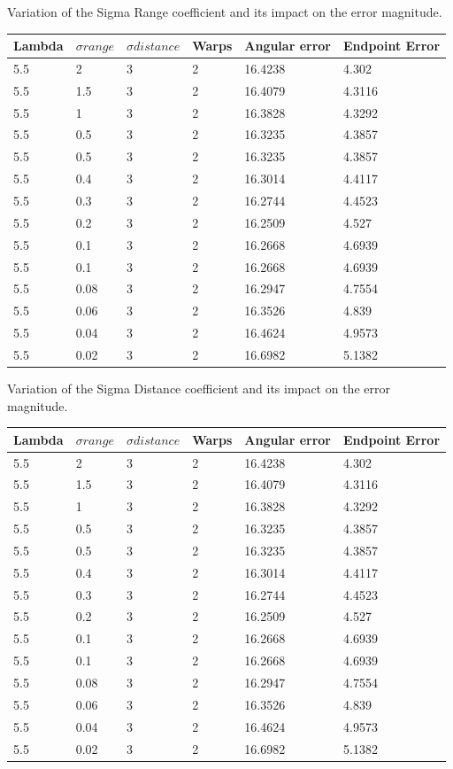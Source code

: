 \documentclass[12pt,a4paper,twoside]{report}
\begin{document}
{\newpage
 Variation of the Sigma Range coefficient and its impact on the error magnitude.
 \begin{center}
 	\begin{tabular}{  l  l  l  l  l l}
 		\hline
 		Lambda &  $\sigma range$ & $\sigma distance$ & Warps & Angular error & Endpoint Error \\ \hline
 		\hline
5.5 & 2 & 3 & 2 & 16.4238 & 4.302\\ 
5.5 & 1.5 & 3 & 2 & 16.4079 & 4.3116\\ 
5.5 & 1 & 3 & 2 & 16.3828 & 4.3292\\ 
5.5 & 0.5 & 3 & 2 & 16.3235 & 4.3857\\ 
5.5 & 0.5 & 3 & 2 & 16.3235 & 4.3857\\ 
5.5 & 0.4 & 3 & 2 & 16.3014 & 4.4117\\ 
5.5 & 0.3 & 3 & 2 & 16.2744 & 4.4523\\ 
5.5 & 0.2 & 3 & 2 & 16.2509 & 4.527\\ 
5.5 & 0.1 & 3 & 2 & 16.2668 & 4.6939\\ 
5.5 & 0.1 & 3 & 2 & 16.2668 & 4.6939\\ 
5.5 & 0.08 & 3 & 2 & 16.2947 & 4.7554\\ 
5.5 & 0.06 & 3 & 2 & 16.3526 & 4.839\\ 
5.5 & 0.04 & 3 & 2 & 16.4624 & 4.9573\\ 
5.5 & 0.02 & 3 & 2 & 16.6982 & 5.1382\\ 
 	\end{tabular}
 \end{center} 
 \newpage
  Variation of the Sigma Distance coefficient and its impact on the error magnitude.
  \begin{center}
  	\begin{tabular}{  l  l  l  l  l l}
  		\hline
  		Lambda&  $\sigma range$ & $\sigma distance$& Warps & Angular error & Endpoint Error \\ \hline
  		\hline
  		5.5 & 2 & 3 & 2 & 16.4238 & 4.302\\ 
  		5.5 & 1.5 & 3 & 2 & 16.4079 & 4.3116\\ 
  		5.5 & 1 & 3 & 2 & 16.3828 & 4.3292\\ 
  		5.5 & 0.5 & 3 & 2 & 16.3235 & 4.3857\\ 
  		5.5 & 0.5 & 3 & 2 & 16.3235 & 4.3857\\ 
  		5.5 & 0.4 & 3 & 2 & 16.3014 & 4.4117\\ 
  		5.5 & 0.3 & 3 & 2 & 16.2744 & 4.4523\\ 
  		5.5 & 0.2 & 3 & 2 & 16.2509 & 4.527\\ 
  		5.5 & 0.1 & 3 & 2 & 16.2668 & 4.6939\\ 
  		5.5 & 0.1 & 3 & 2 & 16.2668 & 4.6939\\ 
  		5.5 & 0.08 & 3 & 2 & 16.2947 & 4.7554\\ 
  		5.5 & 0.06 & 3 & 2 & 16.3526 & 4.839\\ 
  		5.5 & 0.04 & 3 & 2 & 16.4624 & 4.9573\\ 
  		5.5 & 0.02 & 3 & 2 & 16.6982 & 5.1382\\ 
  	\end{tabular}
  \end{center} 

}
\end{document}
